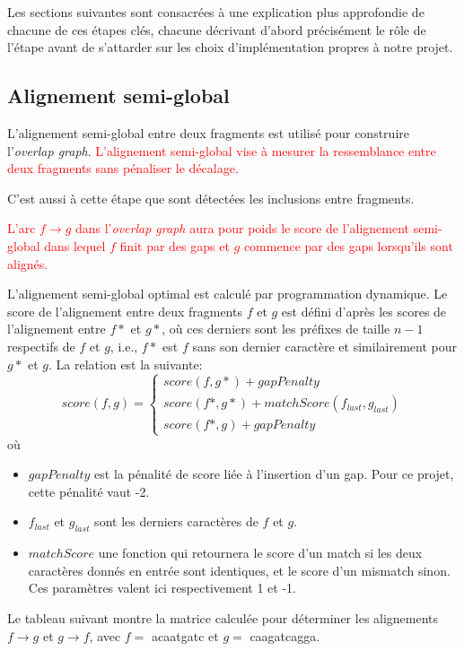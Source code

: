 \documentclass{article}
\begin{document}
Les sections suivantes sont consacrées à une explication plus approfondie de chacune de ces étapes clés, chacune décrivant d'abord précisément le rôle de l'étape avant de s'attarder sur les choix d'implémentation propres à notre projet.

\subsection{Alignement semi-global}

L'alignement semi-global entre deux fragments est utilisé pour construire l'\textit{overlap graph}. \textcolor{red}{L'alignement semi-global vise à mesurer la ressemblance entre deux fragments sans pénaliser le décalage.} 

C'est aussi à cette étape que sont détectées les inclusions entre fragments.

\textcolor{red}{
L'arc $f \to g$ dans l'\textit{overlap graph} aura pour poids le score de l'alignement semi-global dans lequel $f$ finit par des gaps et $g$ commence par des gaps lorsqu'ils sont alignés.}

L'alignement semi-global optimal est calculé par programmation dynamique. 
Le score de l'alignement entre deux fragments $f$ et $g$ est défini d'après les scores de l'alignement entre $f*$ et $g*$, où ces derniers sont les préfixes de taille $n-1$ respectifs de $f$ et $g$, i.e., $f*$ est $f$ sans son dernier caractère et similairement pour $g*$ et $g$.
La relation est la suivante:
$$score(f, g) = 
 \left\{
    \begin{array}{ll}
        score(f,g*)+gapPenalty \\
        score(f*,g*)+matchScore(f_{last}, g_{last})\\
        score(f*,g)+gapPenalty
    \end{array}
\right.$$
où 
\begin{itemize}
\item $gapPenalty$ est la pénalité de score liée à l'insertion d'un gap. Pour ce projet, cette pénalité vaut -2.
\item $f_{last}$ et $g_{last}$ sont les derniers caractères de $f$ et $g$.
\item $matchScore$ une fonction qui retournera le score d'un match si les deux caractères donnés en entrée sont identiques, et le score d'un mismatch sinon. Ces paramètres valent ici respectivement 1 et -1.
\end{itemize} 

\newpage
Le tableau suivant montre la matrice calculée pour déterminer les alignements $f \to g$ et $g \to f$, avec $f =$ acaatgatc et $g =$ caagatcagga.
\end{document}

